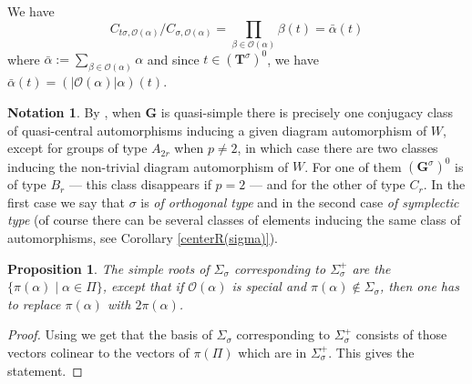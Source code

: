 \documentclass{amsart}
\newtheorem{proposition}[equation]{Proposition}
\numberwithin{equation}{section}
\theoremstyle{definition}
\newtheorem{notation}[equation]{Notation}
\theoremstyle{remark}
\newcommand\bG{{\mathbf G}}
\newcommand\bT{{\mathbf T}}
\newcommand\CO{{\mathcal O}}
\newcommand\Gs{{\bG^\sigma}}
\newcommand\Gso{{(\Gs)^0}}
\newcommand\Tso{{(\bT^\sigma)^0}}
\newcommand\card[1]{{|#1|}}
\begin{document}
We have
\begin{equation}\label{CtsO}
C_{t\sigma,\CO(\alpha)}/C_{\sigma,\CO(\alpha)}=
\prod_{\beta\in\CO(\alpha)}\beta(t)=\bar\alpha(t)
\end{equation}
where $\bar\alpha:=\sum_{\beta\in\CO(\alpha)}\alpha$
and since $t\in\Tso$, we have $\bar\alpha(t)=(\card{\CO(\alpha)}\alpha)(t)$.

\begin{notation}\label{symplectic type}
By  \cite [remarks following 1.22]{grnc},  when $\bG$ is quasi-simple there
is  precisely one conjugacy class of quasi-central automorphisms inducing a
given  diagram  automorphism  of  $W$,  except for
groups  of type $A_{2r}$ when $p\neq 2$, in which case  there are two classes
inducing the
non-trivial diagram automorphism of $W$. For one of them $\Gso$ is of type
$B_r$  --- this class disappears if $p=2$ --- 
and  for  the  other of type $C_r$.
In the first case we say that $\sigma$ is {\em of orthogonal type} and
in the second case {\em of symplectic type}
(of course there can be several classes of elements inducing the same class 
of automorphisms, see Corollary \ref{centerR(sigma)}).
\end{notation}

\begin{proposition}
The simple roots of $\Sigma_\sigma$ corresponding to $\Sigma_\sigma^+$ 
are the  $\{\pi(\alpha)\mid  \alpha\in\Pi\}$,  except that  if
$\CO(\alpha)$  is special and  $\pi(\alpha)\notin\Sigma_\sigma$, then one has
to   replace  $\pi(\alpha)$  with  $2\pi(\alpha)$.
\end{proposition}
\begin{proof}
Using \cite[1.32]{St} we get that the basis of $\Sigma_\sigma$ corresponding
to $\Sigma_\sigma^+$  consists 
of those vectors colinear to the vectors of $\pi(\Pi)$ which are in 
$\Sigma_\sigma^+$. This gives the statement.
\end{proof}
\end{document}
